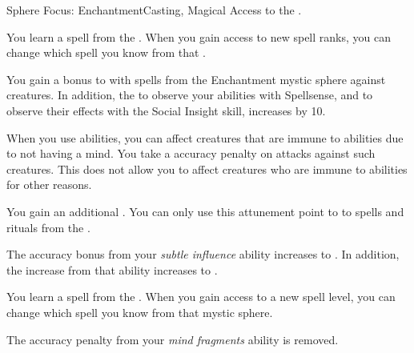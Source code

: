     \begin{feat}{Sphere Focus: Enchantment}{Casting, Magical}
        \featpre Access to the  .

         You learn a spell from the  .
        When you gain access to new spell ranks, you can change which spell you know from that .

         You gain a  bonus to  with spells from the Enchantment mystic sphere against \unaware creatures.
        In addition, the  to observe your  abilities with Spellsense, and to observe their effects with the Social Insight skill, increases by 10.

         When you use  abilities, you can affect creatures that are immune to  abilities due to not having a mind.
        You take a  accuracy penalty on attacks against such creatures.
        This does not allow you to affect creatures who are immune to  abilities for other reasons.

         You gain an additional .
        You can only use this attunement point to  to spells and rituals from the  .

         The accuracy bonus from your \textit{subtle influence} ability increases to .
        In addition, the  increase from that ability increases to .

         You learn a spell from the  .
        When you gain access to a new spell level, you can change which spell you know from that mystic sphere.

         The accuracy penalty from your \textit{mind fragments} ability is removed.
    \end{feat}

